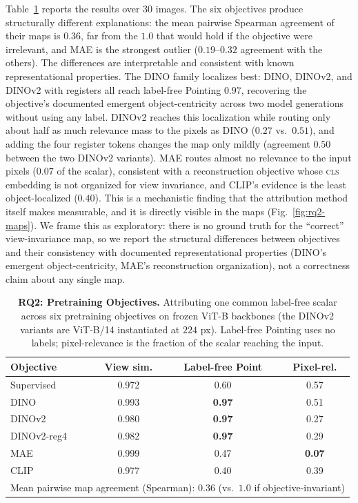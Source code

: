 \documentclass[lettersize,journal]{IEEEtran}
\begin{document}
Table~\ref{tab:rq2} reports the results over 30 images. The six objectives produce structurally different explanations: the mean pairwise Spearman agreement of their maps is $0.36$, far from the $1.0$ that would hold if the objective were irrelevant, and MAE is the strongest outlier ($0.19$--$0.32$ agreement with the others). The differences are interpretable and consistent with known representational properties. The DINO family localizes best: DINO, DINOv2, and DINOv2 with registers all reach label-free Pointing $0.97$, recovering the objective's documented emergent object-centricity across two model generations without using any label. DINOv2 reaches this localization while routing only about half as much relevance mass to the pixels as DINO ($0.27$ vs.\ $0.51$), and adding the four register tokens changes the map only mildly (agreement $0.50$ between the two DINOv2 variants). MAE routes almost no relevance to the input pixels ($0.07$ of the scalar), consistent with a reconstruction objective whose \textsc{cls} embedding is not organized for view invariance, and CLIP's evidence is the least object-localized ($0.40$). This is a mechanistic finding that the attribution method itself makes measurable, and it is directly visible in the maps (Fig.~\ref{fig:rq2-maps}). We frame this as exploratory: there is no ground truth for the ``correct'' view-invariance map, so we report the structural differences between objectives and their consistency with documented representational properties (DINO's emergent object-centricity, MAE's reconstruction organization), not a correctness claim about any single map.

\begin{table}[h]
  \centering
  \caption{\textbf{RQ2: Pretraining Objectives.} Attributing one common label-free scalar across six pretraining objectives on frozen ViT-B backbones (the DINOv2 variants are ViT-B/14 instantiated at $224$ px). Label-free Pointing uses no labels; pixel-relevance is the fraction of the scalar reaching the input.}
  \label{tab:rq2}
  \setlength{\tabcolsep}{5pt}
  \begin{tabular}{l c c c}
    \toprule
    Objective & View sim. & Label-free Point & Pixel-rel. \\
    \midrule
    Supervised  & 0.972 & 0.60 & 0.57 \\
    DINO        & 0.993 & \textbf{0.97} & 0.51 \\
    DINOv2      & 0.980 & \textbf{0.97} & 0.27 \\
    DINOv2-reg4 & 0.982 & \textbf{0.97} & 0.29 \\
    MAE         & 0.999 & 0.47 & \textbf{0.07} \\
    CLIP        & 0.977 & 0.40 & 0.39 \\
    \midrule
    \multicolumn{4}{l}{\footnotesize Mean pairwise map agreement (Spearman): $\mathbf{0.36}$ (vs.\ $1.0$ if objective-invariant)} \\
    \bottomrule
  \end{tabular}
\end{table}
\end{document}
